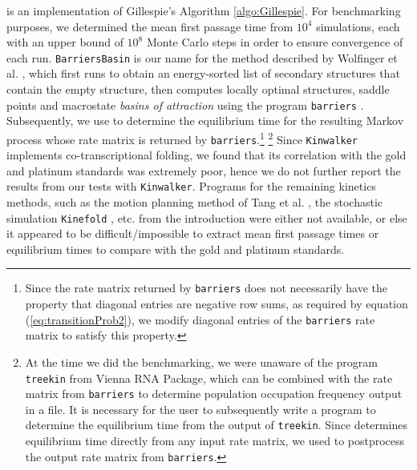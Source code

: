 \kinfold \cite{flamm} is an implementation of Gillespie's
Algorithm \ref{algo:Gillespie}.
For benchmarking purposes, we determined the mean first passage time
from $10^4$ \kinfold simulations, each with an upper bound of
$10^8$ Monte Carlo steps in order to ensure convergence of each run.
{\tt BarriersBasin} is our name for the method described by Wolfinger
et al. \cite{wolfingerStadler:kinetics}, which first runs
\rnasub \cite{flammHofacker} to obtain an energy-sorted list of
secondary structures that contain the empty structure,
then computes locally optimal structures, saddle points and macrostate
{\em basins of attraction}  using the program {\tt barriers}
\cite{wolfingerStadler:kinetics}. Subsequently, we use \hermes to
determine the equilibrium time for the resulting Markov process whose
rate matrix is returned by {\tt barriers}.\footnote{Since
the rate matrix returned by {\tt barriers}
does not necessarily have the property that diagonal entries are negative
row sums, as required by equation (\ref{eq:transitionProb2}), we modify
diagonal entries of the {\tt barriers} rate matrix to satisfy this property.}
\footnote{At the time we did the benchmarking, we were unaware of the
program {\tt treekin} from Vienna RNA Package, which can be combined with
the rate matrix from {\tt barriers} to determine population occupation
frequency output in a file. It is necessary for the user to subsequently
write a program to determine the equilibrium time from the output of
{\tt treekin}. Since \hermes determines equilibrium time directly
from any input rate matrix, we used \hermes to postprocess the
output rate matrix from {\tt barriers}.}
Since {\tt Kinwalker} \cite{Geis.jmb08} implements co-transcriptional folding,
we found that its correlation with the gold and platinum standards was
extremely poor, hence we do not further report the results from our tests
with {\tt Kinwalker}.
Programs for the remaining kinetics methods, such as the motion planning
method of Tang et al. \cite{Tang.jmb08}, the stochastic simulation
{\tt Kinefold} \cite{Xayaphoummine.nar05}, etc.
from the introduction were either not available, or else it
appeared to be difficult/impossible to extract
mean first passage times or equilibrium times to compare with the
gold and platinum standards.


